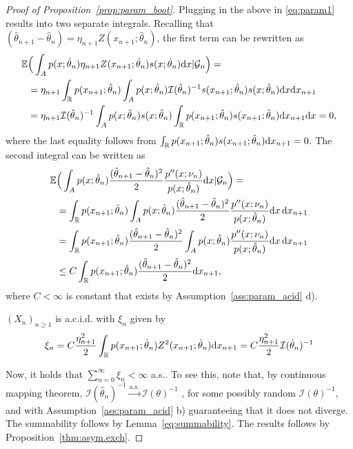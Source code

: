 \documentclass{article}
\theoremstyle{definition}
\newcommand{\di}{{\rm d}}
\renewcommand{\&}{and}
\begin{document}
\begin{proof}[Proof of Proposition~\ref{prop:param_boot}]
\noindent Plugging in the above in \eqref{eq:param1} results into two separate integrals. Recalling that $(\hat{\theta}_{n+1}-\hat{\theta}_{n})=\eta_{n+1} Z (x_{n+1}; \hat{\theta}_n)$, the first term can be rewritten as
\begin{align*}
\mathbb{E} & \Big( 
\int_{A}p(x;\hat{\theta}_{n}) \eta_{n+1} Z(x_{n+1};\hat{\theta}_{n}) s(x;\hat{\theta}_{n}) \di x| \mathcal{G}_{n}\Big)= \\
& =\eta_{n+1} \int_{\mathbb{R}} p(x_{n+1};\hat{\theta}_{n})\int_{A}p(x;\hat{\theta}_{n}) \mathcal{I}(\hat{\theta}_{n})^{-1}s(x_{n+1};\hat{\theta}_{n}) s(x;\hat{\theta}_{n}) \di x \di x_{n+1}\\
&=\eta_{n+1}\mathcal{I}(\hat{\theta}_{n})^{-1}\int_{A} p(x;\hat{\theta}_{n}) s(x;\hat{\theta}_{n}) \int_{\mathbb{R}} p(x_{n+1};\hat{\theta}_{n})  s(x_{n+1};\hat{\theta}_{n})  \di x_{n+1} \di x =0,
\end{align*}
where the last equality follows from $\int_{\mathbb{R}} p(x_{n+1};\hat{\theta}_{n})  s(x_{n+1};\hat{\theta}_{n})  \di x_{n+1}=0$. The second integral can be written as 
\begin{align*}
\mathbb{E} & \Big( 
\int_{A}p(x;\hat{\theta}_{n}) \frac{(\hat{\theta}_{n+1}-\hat{\theta}_{n})^2}{2}\frac{p''(x;\nu_{n})}{p(x;\hat{\theta}_{n})} \di x| \mathcal{G}_{n}\Big)=\\
&=\int_{\mathbb{R}} p(x_{n+1};\hat{\theta}_{n}) \int_A p(x;\hat{\theta}_{n}) \frac{(\hat{\theta}_{n+1}-\hat{\theta}_{n})^2}{2}\frac{p''(x;\nu_{n})}{p(x;\hat{\theta}_{n})} \di x \, \di x_{n+1}\\
&= \int_{\mathbb{R}} p(x_{n+1};\hat{\theta}_{n}) \frac{(\hat{\theta}_{n+1}-\hat{\theta}_{n})^2}{2} \int_A p(x;\hat{\theta}_{n}) \frac{p''(x;\nu_{n})}{p(x;\hat{\theta}_{n})} \di x \, \di x_{n+1}\\
&\leq C \int_{\mathbb{R}} p(x_{n+1};\hat{\theta}_{n}) \frac{(\hat{\theta}_{n+1}-\hat{\theta}_{n})^2}{2} \di x_{n+1},
\end{align*}
where $C<\infty$ is constant  that exists by Assumption~\ref{ass:param_acid} d). 

\noindent $(X_n)_{n \geq 1}$ is a.c.i.d. with $\xi_n$ given  by 
\begin{equation}\label{eq:param_boot_xi_n}
\xi_n = C \frac{\eta_{n+1}^2}{2}\int_{\mathbb{R}} p(x_{n+1};\hat{\theta}_{n}) Z^2(x_{n+1};\hat{\theta}_{n}) \di x_{n+1} = C \frac{\eta_{n+1}^2}{2}\mathcal{I}(\hat{\theta}_n)^{-1}
\end{equation}

\noindent Now, it holds that $\sum_{n=0}^{\infty} \xi_n< \infty$ a.s.. To see this, note that, by continuous mapping theorem, $\mathcal{I}(\hat{\theta}_n)^{-1} \stackrel{\text{a.s.}}{\to} \mathcal{I}(\theta)^{-1}$ , for some possibly random $\mathcal{I}(\theta)^{-1}$, and with Assumption~\ref{ass:param_acid} b) guaranteeing that it does not diverge. The summability follows by Lemma~\ref{eq:summability}. The results follows by Proposition~\ref{thm:asym.exch}.
\end{proof}
\end{document}
